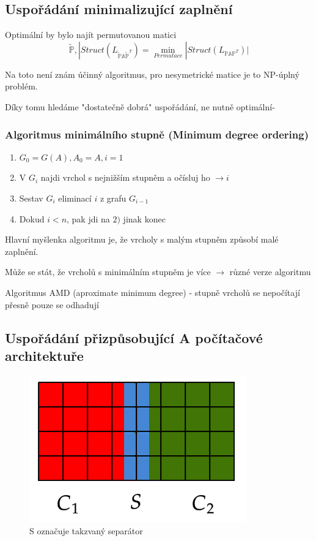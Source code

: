 \documentclass[../main.tex]{subfiles}
\begin{document}
\subsection{Uspořádání minimalizující zaplnění}

Optimální by bylo najít permutovanou matici $$\tilde{\mathbb{P}}, |Struct(L_{\tilde{\mathbb{P}} \mathbb{A} \tilde{\mathbb{P}}^T}) = \min_{Permutace} |Struct(L_{\mathbb{P}\mathbb{A}\mathbb{P}^T})|$$

Na toto není znám účinný algoritmus, pro nesymetrické matice je to NP-úplný problém.

Díky tomu hledáme "dostatečně dobrá" uspořádání, ne nutně optimální-

\subsubsection{Algoritmus minimálního stupně (Minimum degree ordering)}

\begin{enumerate}
    \item $G_0 = G(A), A_0 = A, i=1$
    \item V $G_{i}$ najdi vrchol s nejnižším stupněm a očísluj ho $\rightarrow i$
    \item Sestav $G_i$ eliminací $i$ z grafu $G_{i-1}$
    \item Dokud $i<n$, pak jdi na $2)$ jinak konec 
\end{enumerate}

Hlavní myšlenka algoritmu je, že vrcholy s malým stupněm způsobí malé zaplnění.

\begin{remark}
    Může se stát, že vrcholů s minimálním stupněm je více $\rightarrow$ různé verze algoritmu 
\end{remark}

\begin{remark}
    Algoritmus AMD (aproximate minimum degree) - stupně vrcholů se nepočítají přesně pouze se odhadují
\end{remark}

\subsection{Uspořádání přizpůsobující A počítačové architektuře}

\begin{figure}[H]
    \centering
    \includegraphics[width=0.5\linewidth]{images/2-11-usporadani.png}
    \caption*{S označuje takzvaný separátor}
\end{figure}
\end{document}
